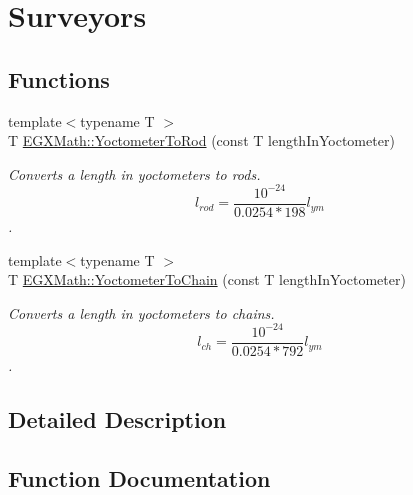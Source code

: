 \hypertarget{group___e_g_x_math-_conversions-_length_conversions-_s_i-_yoctometer-_surveyors}{}\section{Surveyors}
\label{group___e_g_x_math-_conversions-_length_conversions-_s_i-_yoctometer-_surveyors}
\subsection*{Functions}
\begin{DoxyCompactItemize}
\item 
{\footnotesize template$<$typename T $>$ }\\T \mbox{\hyperlink{group___e_g_x_math-_conversions-_length_conversions-_s_i-_yoctometer-_surveyors_gaabe3a5aaa7081b0489d25f0b2117c11b}{E\+G\+X\+Math\+::\+Yoctometer\+To\+Rod}} (const T length\+In\+Yoctometer)
\begin{DoxyCompactList}\small\item\em Converts a length in yoctometers to rods. \[ l_{rod}= \frac{10^{-24}}{0.0254 * 198} l_{ym} \]. \end{DoxyCompactList}\item 
{\footnotesize template$<$typename T $>$ }\\T \mbox{\hyperlink{group___e_g_x_math-_conversions-_length_conversions-_s_i-_yoctometer-_surveyors_ga982ac95d1a3ac5e02e983e355af983d0}{E\+G\+X\+Math\+::\+Yoctometer\+To\+Chain}} (const T length\+In\+Yoctometer)
\begin{DoxyCompactList}\small\item\em Converts a length in yoctometers to chains. \[ l_{ch}= \frac{10^{-24}}{0.0254 * 792} l_{ym} \]. \end{DoxyCompactList}\end{DoxyCompactItemize}


\subsection{Detailed Description}


\subsection{Function Documentation}
\mbox{\label{group___e_g_x_math-_conversions-_length_conversions-_s_i-_yoctometer-_surveyors_ga982ac95d1a3ac5e02e983e355af983d0}} 
